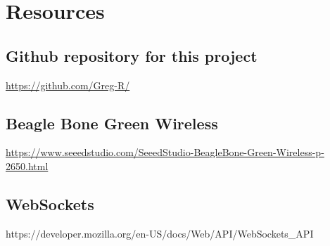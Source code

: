 %
%
%

\chapter{Resources}

\section{Github repository for this project}

\url{https://github.com/Greg-R/}



\section{Beagle Bone Green Wireless}

\url{https://www.seeedstudio.com/SeeedStudio-BeagleBone-Green-Wireless-p-2650.html}

\section{WebSockets}

https://developer.mozilla.org/en-US/docs/Web/API/WebSockets_API


